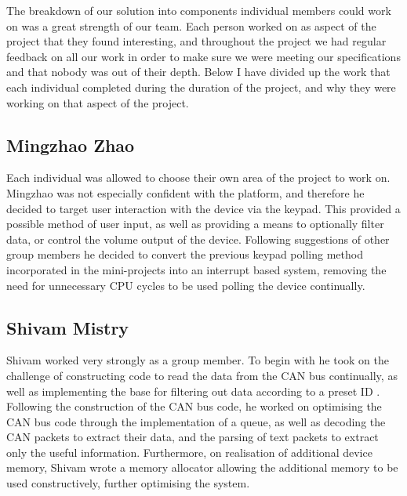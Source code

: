 The breakdown of our solution into components individual members could work on 
was a great strength of our team. Each person worked on as aspect of the project 
that they found interesting, and throughout the project we had regular feedback 
on all our work in order to make sure we were meeting our specifications and 
that nobody was out of their depth. Below I have divided up the work that each 
individual completed during the duration of the project, and why they were 
working on that aspect of the project. 

\subsection*{Mingzhao Zhao}
Each individual was allowed to choose their own area of the project to work on. 
Mingzhao was not especially confident with the platform, and therefore he 
decided to target user interaction with the device via the keypad. This 
provided a possible method of user input, as well as providing a means to 
optionally filter data, or control the volume output of the device. 
Following suggestions 
of other group members he decided to convert the previous keypad polling method 
incorporated in the mini-projects into an interrupt based system, removing the 
need for unnecessary CPU cycles to be used polling the device continually. 

\subsection*{Shivam Mistry} 
Shivam worked very strongly as a group member. To begin with he took on the 
challenge of constructing code to read the data from the CAN bus continually, 
as well as implementing the base for filtering out data according to a preset ID
. Following the construction of the CAN bus code, he worked on optimising the 
CAN bus code through the
implementation of a queue, as well as decoding the CAN packets to extract their
data, and the parsing of text packets to extract only the useful information. 
Furthermore, on realisation of additional device memory, Shivam wrote a memory 
allocator allowing the additional memory to be used constructively, further 
optimising the system. 

